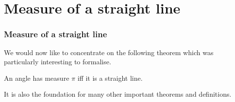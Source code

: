 \documentclass{beamer}
\begin{document}
\section{Measure of a straight line}
\begin{frame}
\frametitle{Measure of a straight line}
\begin{center} 
 We would now like to concentrate on the following theorem which was particularly interesting to formalise.
 
 \medskip
 
 An angle has measure $\pi$ iff it is a straight line.
 
 \medskip
 
 It is also the foundation for many other important theorems and definitions.
 \end{center}
 
\end{frame}
\end{document}
